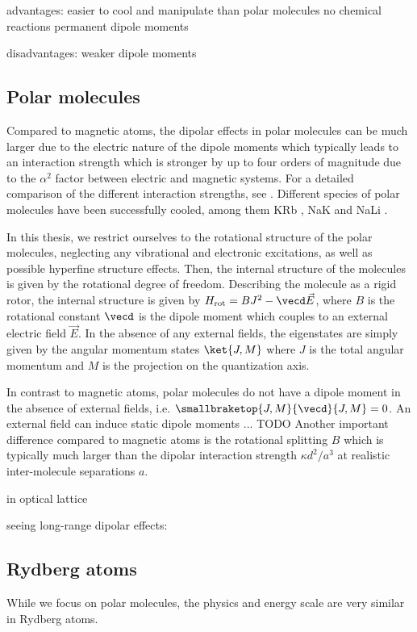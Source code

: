 advantages:
easier to cool and manipulate than polar molecules
no chemical reactions
permanent dipole moments

disadvantages:
weaker dipole moments

\subsection{Polar molecules}

Compared to magnetic atoms, the dipolar effects in polar molecules
can be much larger due to the electric nature of the dipole moments
which typically leads to an interaction strength which is stronger by
up to four orders of magnitude due to the $\alpha^2$ factor between
electric and magnetic systems. For a detailed comparison of the
different interaction strengths, see \cite{}.
Different species of polar molecules have been successfully cooled,
among them KRb \cite{Ni2008b,Ospelkaus2010}, NaK \cite{Wu2012a} and NaLi \cite{Heo2012}.

In this thesis, we restrict ourselves to the rotational structure of the
polar molecules, neglecting any vibrational and electronic excitations,
as well as possible hyperfine structure effects. Then, the internal
structure of the molecules is given by the rotational degree of freedom.
Describing the molecule as a rigid rotor, the internal structure is
given by $H_\text{rot}=B J^2 - \vecd \vec{E}$, where $B$ is the rotational
constant $\vecd$ is the dipole moment which couples to an external
electric field $\vec{E}$. In the absence of any external fields, the
eigenstates are simply given by the angular momentum states $\ket{J,M}$
where $J$ is the total angular momentum and $M$ is the projection on the
quantization axis.

In contrast to magnetic atoms, polar molecules do not have a dipole moment
in the absence of external fields, i.e. $\smallbraketop{J,M}{\vecd}{J,M}=0$.
An external field can induce static dipole moments ... TODO
Another important difference compared to magnetic atoms is the rotational splitting $B$
which is typically much larger than the dipolar interaction strength $\kappa d^2/a^3$
at realistic inter-molecule separations $a$.

in optical lattice \cite{Chotia2012}

seeing long-range dipolar effects:
\cite{Yan2013}


\subsection{Rydberg atoms}
While we focus on polar molecules, the physics and energy scale are very similar
in Rydberg atoms.

